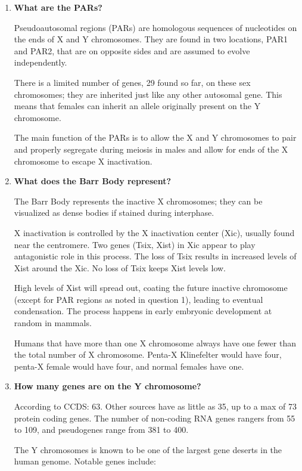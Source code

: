 \documentclass[plain,basic]{inVerba-notes}
\begin{document}
  \begin{enumerate}
    \item \textbf{What are the PARs?}
    
    Pseudoautosomal regions (PARs) are homologous sequences of nucleotides on the ends of X and Y chromosomes. They are found in two locations, PAR1 and PAR2, that are on opposite sides and are assumed to evolve independently.

    There is a limited number of genes, 29 found so far, on these sex chromosomes; they are inherited just like any other autosomal gene. This means that females can inherit an allele originally present on the Y chromosome. 

    The main function of the PARs is to allow the X and Y chromosomes to pair and properly segregate during meiosis in males and allow for ends of the X chromosome to escape X inactivation. 

    \item \textbf{What does the Barr Body represent?}

    The Barr Body represents the inactive X chromosomes; they can be visualized as dense bodies if stained during interphase.

    X inactivation is controlled by the X inactivation center (Xic), usually found near the centromere. Two genes (Tsix, Xist) in Xic appear to play antagonistic role in this process. The loss of Tsix results in increased levels of Xist around the Xic. No loss of Tsix keeps Xist levels low. 

    High levels of Xist will spread out, coating the future inactive chromosome (except for PAR regions as noted in question 1), leading to eventual condensation. The process happens in early embryonic development at random in mammals. 

    Humans that have more than one X chromosome always have one fewer than the total number of X chromosome. Penta-X Klinefelter would have four, penta-X female would have four, and normal females have one.

    \item \textbf{How many genes are on the Y chromosome?}
    
    According to CCDS\@: 63. Other sources have as little as 35, up to a max of 73 protein coding genes. The number of non-coding RNA genes rangers from 55 to 109, and pseudogenes range from 381 to 400.

    The Y chromosomes is known to be one of the largest gene deserts in the human genome. Notable genes include: 


\end{enumerate}
\end{document}

